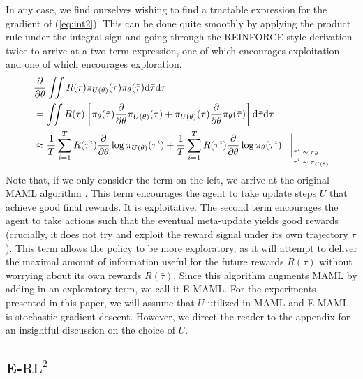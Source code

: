 \documentclass{article} %
\begin{document}
In any case, we find ourselves wishing to find a tractable expression for the gradient of (\ref{eq:int2}). This can be done quite smoothly by applying the product rule under the integral sign and going through the REINFORCE style derivation twice to arrive at a two term expression, one of which encourages exploitation and one of which encourages exploration.
\begin{align}
& \frac{\partial}{\partial \theta} \iint R(\tau) \pi_{U(\theta)} (\tau) \pi_\theta (\bar{\tau})\mathrm{d}\bar{\tau}\mathrm{d}\tau \nonumber\\
&= \iint R(\tau) \left[ \pi_\theta(\bar{\tau}) \frac{\partial}{\partial \theta} \pi_{U(\theta)} (\tau) + \pi_{U(\theta)}(\tau) \frac{\partial}{\partial \theta} \pi_\theta (\bar{\tau}) \right]\mathrm{d}\bar{\tau}\mathrm{d}\tau \nonumber\\
& \approx \frac{1}{T} \sum_{i=1}^T R(\tau^{i}) \frac{\partial}{\partial \theta} \log \pi_{U(\theta)} (\tau^i) + \frac{1}{T} \sum_{i=1}^T R(\tau^{i}) \frac{\partial}{\partial \theta} \log \pi_{\theta} (\bar{\tau}^i) \hspace{3mm} \bigg\vert_{
\tiny
\begin{aligned}
\bar{\tau}^i &\sim \pi_\theta\\[-0.5em]
      \tau^i &\sim \pi_{U(\theta)}%
\end{aligned}
}%
\end{align}
Note that, if we only consider the term on the left, we arrive at the original MAML algorithm \cite{maml}. This term encourages the agent to take update steps $U$ that achieve good final rewards. It is exploitative. The second term encourages the agent to take actions such that the eventual meta-update yields good rewards (crucially, it does not try and exploit the reward signal under its own trajectory $\bar{\tau}$). This term allows the policy to be more exploratory, as it will attempt to deliver the maximal amount of information useful for the future rewards $R(\tau)$ without worrying about its own rewards $R(\bar{\tau})$. Since this algorithm augments MAML by adding in an exploratory term, we call it E-MAML. For the experiments presented in this paper, we will assume that $U$ utilized in MAML and E-MAML is stochastic gradient descent. However, we direct the reader to the appendix for an insightful discussion on the choice of $U$.  


\subsection{E-$\text{RL}^2$}
\end{document}

